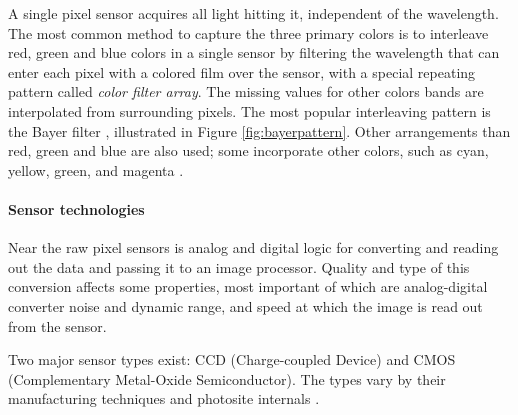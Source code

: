 A single pixel sensor acquires all light hitting it, independent of the wavelength.
The most common method to capture the three primary colors is to interleave red, green and blue colors in a single sensor by filtering the wavelength that can enter each pixel with a colored film over the sensor, with a special repeating pattern called \emph{color filter array}.
The missing values for other colors bands are interpolated from surrounding pixels.
The most popular interleaving pattern is the Bayer filter \cite[p. 76]{szeliski10vision}, illustrated in Figure \ref{fig:bayerpattern}.
Other arrangements than red, green and blue are also used; some incorporate other colors, such as cyan, yellow, green, and magenta \cite{park2003implementing}.



\paragraph{Sensor technologies}
Near the raw pixel sensors is analog and digital logic for converting and reading out the data and passing it to an image processor.
Quality and type of this conversion affects some properties, most important of which are analog-digital converter noise and dynamic range, and speed at which the image is read out from the sensor.

Two major sensor types exist: CCD (Charge-coupled Device) and CMOS (Complementary Metal-Oxide Semiconductor).
The types vary by their manufacturing techniques and photosite internals \cite{nakamura2005image,taylor1998ccd,el2005cmos}.

